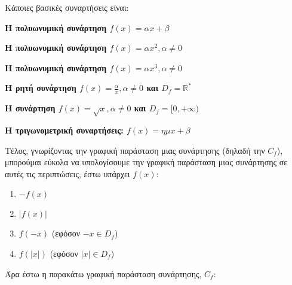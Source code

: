 Κάποιες βασικές συναρτήσεις είναι:

\vspace{1em}

\textbf{Η πολυωνυμική συνάρτηση $f(x) = {\alpha}x + \beta$}


\textbf{Η πολυωνυμική συνάρτηση $f(x) = {\alpha}x^2, \alpha \ne 0$}


\textbf{Η πολυωνυμική συνάρτηση $f(x) = {\alpha}x^3, \alpha \ne 0$}


\textbf{Η ρητή συνάρτηση $f(x) = \frac{\alpha}{x}, \alpha \ne 0$ και $D_{f} = \mathbb{R}^*$}


\newpage

\textbf{Η συνάρτηση $f(x) = \sqrt{x}, \alpha \ne 0$ και $D_{f} = [0,+\infty)$}


\textbf{Η τριγωνομετρική συναρτήσεις: $f(x) = {\eta\mu}x + \beta$}


Τέλος, γνωρίζοντας την γραφική παράσταση μιας συνάρτησης (δηλαδή την $C_{f}$), μπορούμαι εύκολα να υπολογίσουμε την γραφική παράσταση μιας συνάρτησης σε αυτές τις περιπτώσεις, έστω υπάρχει $f(x)$:
\begin{enumerate}
 \item $-f(x)$
 \item $\vert f(x) \vert$
 \item $f(-x)$ (εφόσον $-x \in D_{f}$)
 \item $f(\vert x\vert)$ (εφόσον $\vert x\vert \in D_{f}$)
\end{enumerate}

Άρα έστω η παρακάτω γραφική παράσταση συνάρτησης, $C_{f}$:

\begin{center}
\end{center}

